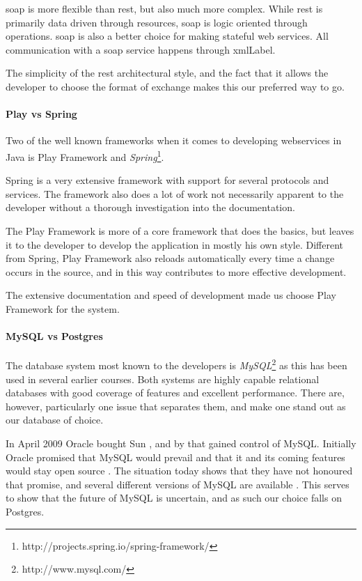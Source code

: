 \documentclass[11pt]{book}
\begin{document}
\gls{soap} is more flexible than \gls{rest}, but also much more complex. While \gls{rest} is primarily data driven through resources, \gls{soap} is logic oriented through operations. \gls{soap} is also a better choice for making stateful web services. All communication with a \gls{soap} service happens through \gls{xmlLabel}.

The simplicity of the \gls{rest} architectural style, and the fact that it allows the developer to choose the format of exchange makes this our preferred way to go.

\paragraph{Play vs Spring}
Two of the well known frameworks when it comes to developing webservices in Java is Play Framework and \emph{Spring}\footnote{http://projects.spring.io/spring-framework/}.

Spring is a very extensive framework with support for several protocols and services. The framework also does a lot of work not necessarily apparent to the developer without a thorough investigation into the documentation.

The Play Framework is more of a core framework that does the basics, but leaves it to the developer to develop the application in mostly his own style. Different from Spring, Play Framework also reloads automatically every time a change occurs in the source, and in this way contributes to more effective development.

The extensive documentation and speed of development made us choose Play Framework for the system.

\paragraph{MySQL vs Postgres}
The database system most known to the developers is \emph{MySQL}\footnote{http://www.mysql.com/} as this has been used in several earlier courses. Both systems are highly capable relational databases with good coverage of features and excellent performance. There are, however, particularly one issue that separates them, and make one stand out as our database of choice.

In April 2009 Oracle bought Sun \cite{sun}, and by that gained control of MySQL. Initially Oracle promised that MySQL would prevail and that it and its coming features would stay open source \cite{mysql}. The situation today shows that they have not honoured that promise, and several different versions of MySQL are available \cite{mysqlproducts}. This serves to show that the future of MySQL is uncertain, and as such our choice falls on Postgres.
\end{document}
